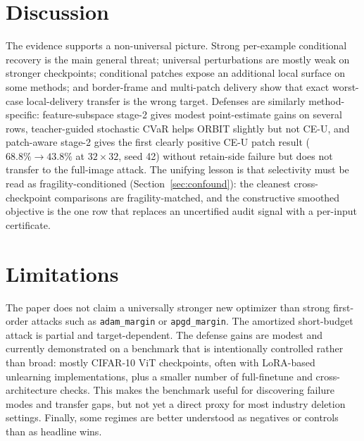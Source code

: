 \documentclass{article}
\begin{document}
\section{Discussion}
The evidence supports a non-universal picture. Strong per-example conditional recovery is the main general threat; universal perturbations are mostly weak on stronger checkpoints; conditional patches expose an additional local surface on some methods; and border-frame and multi-patch delivery show that exact worst-case local-delivery transfer is the wrong target. Defenses are similarly method-specific: feature-subspace stage-2 gives modest point-estimate gains on several rows, teacher-guided stochastic CVaR helps ORBIT slightly but not CE-U, and patch-aware stage-2 gives the first clearly positive CE-U patch result ($68.8\%\!\to\!43.8\%$ at $32\times32$, seed 42) without retain-side failure but does not transfer to the full-image attack. The unifying lesson is that selectivity must be read as fragility-conditioned (Section~\ref{sec:confound}): the cleanest cross-checkpoint comparisons are fragility-matched, and the constructive smoothed objective is the one row that replaces an uncertified audit signal with a per-input certificate.


\section{Limitations}
The paper does not claim a universally stronger new optimizer than strong first-order attacks such as \texttt{adam\_margin} or \texttt{apgd\_margin}. The amortized short-budget attack is partial and target-dependent. The defense gains are modest and currently demonstrated on a benchmark that is intentionally controlled rather than broad: mostly CIFAR-10 ViT checkpoints, often with LoRA-based unlearning implementations, plus a smaller number of full-finetune and cross-architecture checks. This makes the benchmark useful for discovering failure modes and transfer gaps, but not yet a direct proxy for most industry deletion settings. Finally, some regimes are better understood as negatives or controls than as headline wins.
\end{document}
